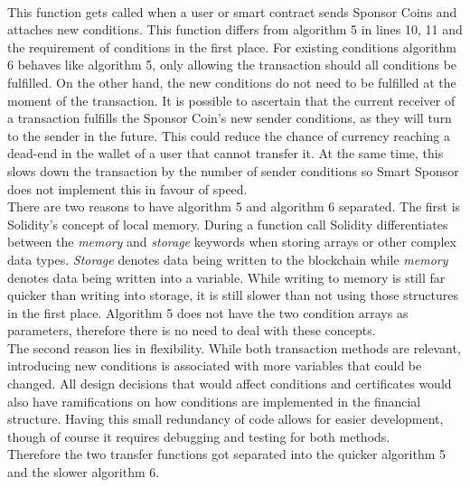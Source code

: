 \\
This function gets called when a user or smart contract sends Sponsor Coins and attaches new conditions. This function differs from algorithm 5 in lines 10, 11 and the requirement of conditions in the first place. For existing conditions algorithm 6 behaves like algorithm 5, only allowing the transaction should all conditions be fulfilled. On the other hand, the new conditions do not need to be fulfilled at the moment of the transaction. It is possible to ascertain that the current receiver of a transaction fulfills the Sponsor Coin's new sender conditions, as they will turn to the sender in the future.  This could reduce the chance of currency reaching a dead-end in the wallet of a user that cannot transfer it. At the same time, this slows down the transaction by the number of sender conditions so Smart Sponsor does not implement this in favour of speed.\\
There are two reasons to have algorithm 5 and algorithm 6 separated. The first is Solidity's concept of local memory. During a function call Solidity differentiates between the \emph{memory} and \emph{storage} keywords when storing arrays or other complex data types. \emph{Storage} denotes data being written to the blockchain while \emph{memory} denotes data being written into a variable. While writing to memory is still far quicker than writing into storage, it is still slower than not using those structures in the first place. Algorithm 5 does not have the two condition arrays as parameters, therefore there is no need to deal with these concepts.\\
The second reason lies in flexibility. While both transaction methods are relevant, introducing new conditions is associated with more variables that could be changed. All design decisions that would affect conditions and certificates would also have ramifications on how conditions are implemented in the financial structure. Having this small redundancy of code allows for easier development, though of course it requires debugging and testing for both methods.\\
Therefore the two transfer functions got separated into the quicker algorithm 5 and the slower algorithm 6.\\
\\
